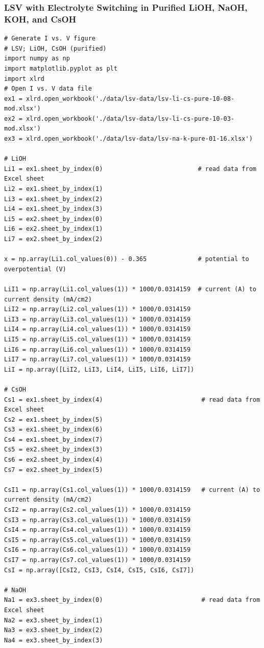 \documentclass[journal=jpccck,manuscript=suppinfo,email=true]{achemso}
\begin{document}
\subsubsection{LSV with Electrolyte Switching in Purified LiOH, NaOH, KOH, and CsOH}
\label{sec-6-1-5}
\begin{verbatim}
# Generate I vs. V figure
# LSV; LiOH, CsOH (purified)
import numpy as np
import matplotlib.pyplot as plt
import xlrd
# Open I vs. V data file
ex1 = xlrd.open_workbook('./data/lsv-data/lsv-li-cs-pure-10-08-mod.xlsx')
ex2 = xlrd.open_workbook('./data/lsv-data/lsv-li-cs-pure-10-03-mod.xlsx')
ex3 = xlrd.open_workbook('./data/lsv-data/lsv-na-k-pure-01-16.xlsx')

# LiOH
Li1 = ex1.sheet_by_index(0)                          # read data from Excel sheet
Li2 = ex1.sheet_by_index(1)
Li3 = ex1.sheet_by_index(2)
Li4 = ex1.sheet_by_index(3)
Li5 = ex2.sheet_by_index(0)
Li6 = ex2.sheet_by_index(1)
Li7 = ex2.sheet_by_index(2)

x = np.array(Li1.col_values(0)) - 0.365              # potential to overpotential (V)

LiI1 = np.array(Li1.col_values(1)) * 1000/0.0314159  # current (A) to current density (mA/cm2)
LiI2 = np.array(Li2.col_values(1)) * 1000/0.0314159
LiI3 = np.array(Li3.col_values(1)) * 1000/0.0314159
LiI4 = np.array(Li4.col_values(1)) * 1000/0.0314159
LiI5 = np.array(Li5.col_values(1)) * 1000/0.0314159
LiI6 = np.array(Li6.col_values(1)) * 1000/0.0314159
LiI7 = np.array(Li7.col_values(1)) * 1000/0.0314159
LiI = np.array([LiI2, LiI3, LiI4, LiI5, LiI6, LiI7])

# CsOH
Cs1 = ex1.sheet_by_index(4)                           # read data from Excel sheet
Cs2 = ex1.sheet_by_index(5)
Cs3 = ex1.sheet_by_index(6)
Cs4 = ex1.sheet_by_index(7)
Cs5 = ex2.sheet_by_index(3)
Cs6 = ex2.sheet_by_index(4)
Cs7 = ex2.sheet_by_index(5)

CsI1 = np.array(Cs1.col_values(1)) * 1000/0.0314159   # current (A) to current density (mA/cm2)
CsI2 = np.array(Cs2.col_values(1)) * 1000/0.0314159
CsI3 = np.array(Cs3.col_values(1)) * 1000/0.0314159
CsI4 = np.array(Cs4.col_values(1)) * 1000/0.0314159
CsI5 = np.array(Cs5.col_values(1)) * 1000/0.0314159
CsI6 = np.array(Cs6.col_values(1)) * 1000/0.0314159
CsI7 = np.array(Cs7.col_values(1)) * 1000/0.0314159
CsI = np.array([CsI2, CsI3, CsI4, CsI5, CsI6, CsI7])

# NaOH
Na1 = ex3.sheet_by_index(0)                           # read data from Excel sheet
Na2 = ex3.sheet_by_index(1)
Na3 = ex3.sheet_by_index(2)
Na4 = ex3.sheet_by_index(3)


\end{verbatim}
\end{document}
